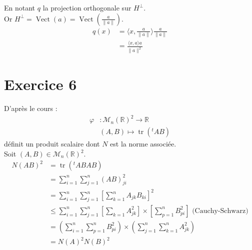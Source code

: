 \documentclass[../main.tex]{subfiles}
\begin{document}
\noindent En notant $q$ la projection orthogonale sur $H^\bot$. \\
Or $H^\bot = \operatorname{Vect}(a) = \operatorname{Vect}\left(\frac{a}{\|a\|}\right)$. 
\begin{align*}
    q(x) &= \langle x, \frac{a}{\|a\|}\rangle \frac{a}{\|a\|} \\
    &= \frac{\langle x, a\rangle a}{\|a\|^2}
\end{align*}

\section*{Exercice 6}
\noindent D'après le cours : 
\begin{align*}
    \varphi&:\mathcal{M}_n(\mathbb{R})^2\to \mathbb{R} \\
    &(A, B)\mapsto \operatorname{tr}({^tAB})
\end{align*}
définit un produit scalaire dont $N$ est la norme associée. \\
Soit $(A, B)\in \mathcal{M}_n(\mathbb{R})^2$. 
\begin{align*}
    N(AB)^2 &= \operatorname{tr}({^tAB}AB) \\
    &= \sum_{i=1}^{n} \sum_{j=1}^{n} (AB)_{ji}^2 \\
    &= \sum_{i=1}^{n} \sum_{j=1}^{n} \left[ \sum_{k=1}^{n} A_{jk} B_{ki} \right]^2 \\
    &\leq \sum_{i=1}^{n} \sum_{j=1}^{n} \left[ \sum_{k=1}^{} A_{jk}^2 \right]\times \left[ \sum_{p=1}^{n} B_{pi}^2 \right] \text{ (Cauchy-Schwarz)} \\
    &= \left( \sum_{i=1}^{n} \sum_{p=1}^{n} B_{pi}^2 \right) \times \left( \sum_{j=1}^{n} \sum_{k=1}^{n} A_{jk}^2 \right) \\
    &= N(A)^2N(B)^2
\end{align*}
\end{document}
